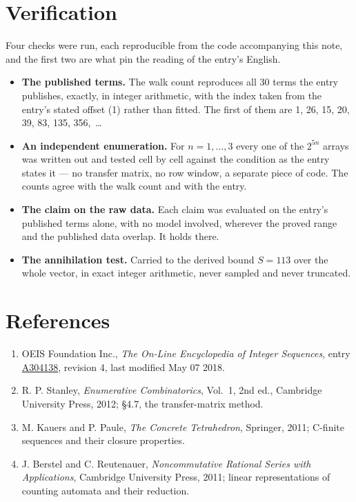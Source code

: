 \documentclass[11pt]{article}
\theoremstyle{definition}
\begin{document}
\section{Verification}

Four checks were run, each reproducible from the code accompanying this note, and the first two are what pin the reading of the entry's English.

\begin{itemize}

\item {\bfseries The published terms.} The walk count reproduces all 30 terms the entry publishes, exactly, in integer arithmetic, with the index taken from the entry's stated offset (1) rather than fitted. The first of them are 1, 26, 15, 20, 39, 83, 135, 356,~\dots

\item {\bfseries An independent enumeration.} For $n = 1,\dots,3$ every one of the $2^{5n}$ arrays was written out and tested cell by cell against the condition as the entry states it --- no transfer matrix, no row window, a separate piece of code. The counts agree with the walk count and with the entry.

\item {\bfseries The claim on the raw data.} Each claim was evaluated on the entry's published terms alone, with no model involved, wherever the proved range and the published data overlap. It holds there.

\item {\bfseries The annihilation test.} Carried to the derived bound $S = 113$ over the whole vector, in exact integer arithmetic, never sampled and never truncated.

\end{itemize}

\section{References}

\begin{enumerate}

\item OEIS Foundation Inc., \emph{The On-Line Encyclopedia of Integer Sequences}, entry \href{https://oeis.org/A304138}{A304138}, revision 4, last modified May 07 2018.

\item R. P. Stanley, \emph{Enumerative Combinatorics}, Vol.~1, 2nd ed., Cambridge University Press, 2012; \S4.7, the transfer-matrix method.

\item M. Kauers and P. Paule, \emph{The Concrete Tetrahedron}, Springer, 2011; C-finite sequences and their closure properties.

\item J. Berstel and C. Reutenauer, \emph{Noncommutative Rational Series with Applications}, Cambridge University Press, 2011; linear representations of counting automata and their reduction.

\end{enumerate}
\end{document}
